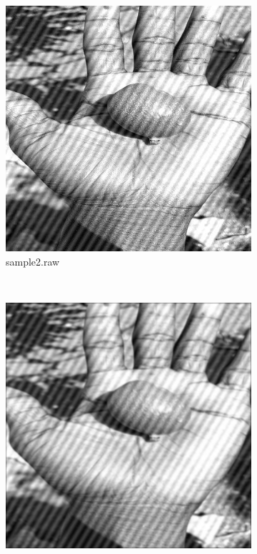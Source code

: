 \documentclass{article}
\begin{document}
\begin{enumerate}[label=(\alph*)]
    \begin{figure}[!htb]
        \centering
        \begin{subfigure}[b]{0.3\textwidth}
            \includegraphics[width=\textwidth]{img/I2.png}
            \caption{sample2.raw}
        \end{subfigure}
        ~
        \begin{subfigure}[b]{0.3\textwidth}
            \includegraphics[width=\textwidth]{img/GF(noise).png}

\end{subfigure}
\end{figure}
\end{enumerate}
\end{document}
